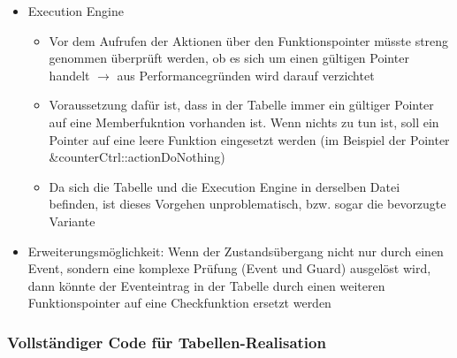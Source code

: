 \begin{itemize}
      \item Execution Engine
            

            \begin{itemize}
                  \item Vor dem Aufrufen der Aktionen über den Funktionspointer müsste streng genommen überprüft werden, ob es sich um einen gültigen Pointer handelt $\rightarrow$ aus Performancegründen wird darauf verzichtet
                  \item Voraussetzung dafür ist, dass in der Tabelle immer ein gültiger Pointer auf eine Memberfukntion vorhanden ist. Wenn nichts zu tun ist, soll ein Pointer auf eine leere Funktion eingesetzt werden (im Beispiel der Pointer \&counterCtrl::actionDoNothing)
                  \item Da sich die Tabelle und die Execution Engine in derselben Datei befinden, ist dieses Vorgehen unproblematisch, bzw. sogar die bevorzugte Variante
            \end{itemize}

      \item Erweiterungsmöglichkeit: Wenn der Zustandsübergang nicht nur durch einen Event, sondern eine komplexe Prüfung (Event und Guard) ausgelöst wird, dann könnte der Eventeintrag in der Tabelle durch einen weiteren Funktionspointer auf eine Checkfunktion ersetzt werden
            
            
            
\end{itemize}

\subsubsection{Vollständiger Code für Tabellen-Realisation}



